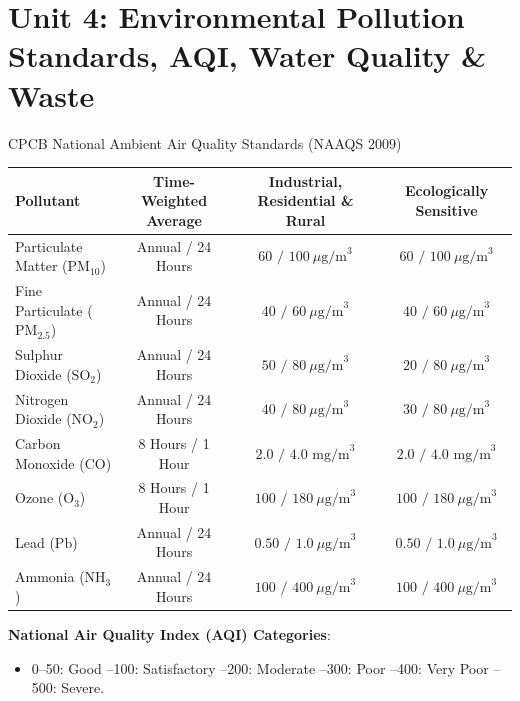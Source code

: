 \chapter{Unit 4: Environmental Pollution Standards, AQI, Water Quality \& Waste}

\begin{formulabox}{CPCB National Ambient Air Quality Standards (NAAQS 2009)}
\begin{center}
\begin{tabularx}{\linewidth}{X c c c}
\toprule
\textbf{Pollutant} & \textbf{Time-Weighted Average} & \textbf{Industrial, Residential \& Rural} & \textbf{Ecologically Sensitive} \\
\midrule
Particulate Matter ($\text{PM}_{10}$) & Annual / 24 Hours & $60\text{ / }100\ \mu\text{g/m}^3$ & $60\text{ / }100\ \mu\text{g/m}^3$ \\
Fine Particulate ($\text{PM}_{2.5}$) & Annual / 24 Hours & $40\text{ / }60\ \mu\text{g/m}^3$ & $40\text{ / }60\ \mu\text{g/m}^3$ \\
Sulphur Dioxide ($\text{SO}_2$) & Annual / 24 Hours & $50\text{ / }80\ \mu\text{g/m}^3$ & $20\text{ / }80\ \mu\text{g/m}^3$ \\
Nitrogen Dioxide ($\text{NO}_2$) & Annual / 24 Hours & $40\text{ / }80\ \mu\text{g/m}^3$ & $30\text{ / }80\ \mu\text{g/m}^3$ \\
Carbon Monoxide ($\text{CO}$) & 8 Hours / 1 Hour & $2.0\text{ / }4.0\text{ mg/m}^3$ & $2.0\text{ / }4.0\text{ mg/m}^3$ \\
Ozone ($\text{O}_3$) & 8 Hours / 1 Hour & $100\text{ / }180\ \mu\text{g/m}^3$ & $100\text{ / }180\ \mu\text{g/m}^3$ \\
Lead ($\text{Pb}$) & Annual / 24 Hours & $0.50\text{ / }1.0\ \mu\text{g/m}^3$ & $0.50\text{ / }1.0\ \mu\text{g/m}^3$ \\
Ammonia ($\text{NH}_3$) & Annual / 24 Hours & $100\text{ / }400\ \mu\text{g/m}^3$ & $100\text{ / }400\ \mu\text{g/m}^3$ \\
\bottomrule
\end{tabularx}
\end{center}
\textbf{National Air Quality Index (AQI) Categories}:
\begin{itemize}[leftmargin=1.2em]
    \item 0--50: Good --100: Satisfactory --200: Moderate --300: Poor --400: Very Poor --500: Severe.
\end{itemize}
\end{formulabox}

